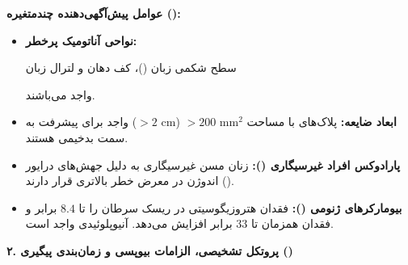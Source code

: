 \documentclass[a4paper]{article}
\newcommand{\hly}[1]{\colorbox{hlyellow}{\strut #1}}
\begin{document}
\vspace{-2pt}
\textbf{عوامل پیش‌آگهی‌دهنده چندمتغیره ():}
\begin{itemize}
    \item \textbf{نواحی آناتومیک پرخطر:} \hly{سطح شکمی زبان ()، کف دهان و لترال زبان} واجد  می‌باشند.
    \item \textbf{ابعاد ضایعه:} پلاک‌های با مساحت $>200\text{ mm}^2$ ($>2\text{ cm}$) واجد  برای پیشرفت به سمت بدخیمی هستند.
    \item \textbf{پارادوکس افراد غیرسیگاری ():} زنان مسن غیرسیگاری به دلیل جهش‌های درایور اندوژن در معرض خطر بالاتری قرار دارند ().
    \item \textbf{بیومارکرهای ژنومی ():} فقدان هتروزیگوسیتی در  ریسک سرطان را تا $8.4$ برابر و فقدان همزمان  تا $33$ برابر افزایش می‌دهد. آنیوپلوئیدی  واجد  است.
\end{itemize}

\vspace{2pt}
{\large\bfseries ۲. پروتکل تشخیصی، الزامات بیوپسی و زمان‌بندی پیگیری ()}
\vspace{1pt}
\end{document}
